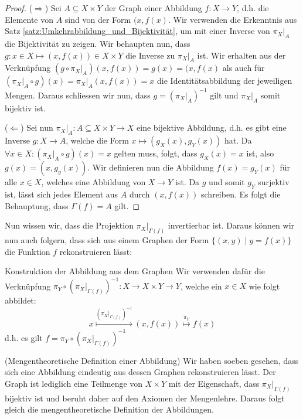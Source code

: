 \begin{proof}
($\Longrightarrow$) Sei $A \subseteq X \times Y$ der Graph einer Abbildung $f: X \to Y$, d.h. die Elemente von $A$ sind von der Form $(x, f(x)$. Wir verwenden die Erkenntnis aus Satz \ref{satz:Umkehrabbildung_und_Bijektivität}, um mit einer Inverse von $\pi_X\vert_A$ die Bijektivität zu zeigen. Wir behaupten nun, dass $g: x \in X \mapsto (x, f(x)) \in X \times Y$ die Inverse zu $\pi_X\vert_A$ ist. Wir erhalten aus der Verknüpfung $(g \circ \pi_X\vert_A)(x, f(x)) = g(x) = (x, f(x)$ als auch für $(\pi_X\vert_A \circ g) (x) = \pi_X\vert_A(x, f(x)) = x$ die Identitätsabbildung der jeweiligen Mengen. Daraus schliessen wir nun, dass $g = (\pi_X\vert_A)^{-1}$ gilt und $\pi_X\vert_A$ somit bijektiv ist.

($\Longleftarrow$) Sei nun $\pi_X\vert_A: A \subseteq X \times Y \to X$ eine bijektive Abbildung, d.h. es gibt eine Inverse $g: X \to A$, welche die Form $x \mapsto (g_X(x), g_Y(x))$ hat. Da $\forall x \in X: (\pi_X\vert_A \circ g)(x) = x$ gelten muss, folgt,  dass $g_X(x) = x$ ist, also $g(x) = (x, g_y(x))$. Wir definieren nun die Abbildung $f(x) = g_Y(x)$ für alle $x \in X$, welches eine Abbildung von $X \to Y$ ist. Da $g$ und somit $g_Y$ surjektiv ist, lässt sich jedes Element aus $A$ durch $(x, f(x))$ schreiben. Es folgt die Behauptung, dass $\Gamma(f) = A$ gilt.
\end{proof}
Nun wissen wir, dass die Projektion $\pi_X\vert_{\Gamma(f)}$ invertierbar ist. Daraus können wir nun auch folgern, dass sich aus einem Graphen der Form $\{(x, y) \mid y = f(x)\}$ die Funktion $f$ rekonstruieren lässt:
\begin{lemma}{Konstruktion der Abbildung aus dem Graphen}{} Wir verwenden dafür die Verknüpfung  $\pi_Y \circ (\pi_X\vert_{\Gamma(f)})^{-1}: X \to X \times Y \to Y$, welche ein $x \in X$ wie folgt abbildet:
$$x \stackrel{(\pi_X\vert_{\Gamma(f)})^{-1}}{\mapsto} (x, f(x)) \stackrel{\pi_Y}{\mapsto} f(x)$$
d.h. es gilt $f = \pi_Y \circ (\pi_X\vert_{\Gamma(f)})^{-1}$
\end{lemma}
\begin{remark}
(Mengentheoretische Definition einer Abbildung) Wir haben soeben gesehen, dass sich eine Abbildung eindeutig aus dessen Graphen rekonstruieren lässt. Der Graph ist lediglich eine Teilmenge von $X \times Y$ mit der Eigenschaft, dass $\pi_X\vert_{\Gamma(f)}$ bijektiv ist und beruht daher auf den Axiomen der Mengenlehre. Daraus folgt gleich die mengentheoretische Definition der Abbildungen.
\end{remark}


